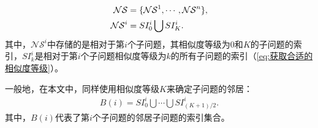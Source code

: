 \vspace{-1em}
\begin{align}
    \label{eq:邻域结构集合}
    \mathcal{NS} & = \{\mathcal{NS}^1, \cdots, \mathcal{NS}^n\}, \\
    \mathcal{NS}^i &= SI^i_0 \bigcup SI^i_K. \notag
\end{align}
其中，$\mathcal{NS}^i$中存储的是相对于第$i$个子问题，其相似度等级为0和$K$的子问题的索引，$SI^i_k$是相对于第$i$个子问题相似度等级为$k$的所有子问题的索引（\autoref{eq:获取合适的相似度等级}）。
\par
一般地，在本文中，同样使用相似度等级$K$来确定子问题的邻居：
\begin{align}
    \label{eq:邻居子问题}
    B(i) = SI^i_0 \bigcup \cdots \bigcup SI^i_{(K+1)/2}.
\end{align}
其中，$B(i)$代表了第$i$个子问题的邻居子问题的索引集合。

